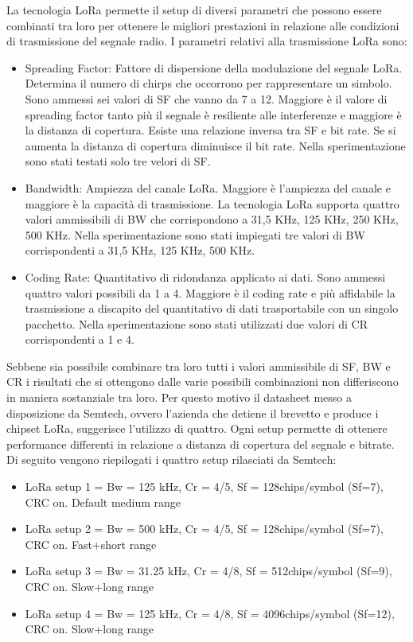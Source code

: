 \documentclass[12pt,a4paper,openright,twoside]{report}
\begin{document}
La tecnologia LoRa permette il setup di diversi parametri che possono essere combinati tra loro per ottenere le migliori prestazioni in relazione alle condizioni di trasmissione del segnale radio. I parametri relativi alla trasmissione LoRa sono:
\begin{itemize}                       
\item Spreading Factor: Fattore di dispersione della modulazione del segnale LoRa. Determina il numero di chirps che occorrono per rappresentare un simbolo. Sono ammessi sei valori di SF che vanno da 7 a 12. Maggiore \`e il valore di spreading factor tanto pi\`u il segnale \`e resiliente alle interferenze e maggiore \`e la distanza di copertura. Esiste una relazione inversa tra SF e bit rate. Se si aumenta la distanza di copertura diminuisce il bit rate. Nella sperimentazione sono stati testati solo tre velori di SF.
\item Bandwidth: Ampiezza del canale LoRa. Maggiore \`e l'ampiezza del canale e maggiore \`e la capacit\`a di trasmissione. La tecnologia LoRa supporta quattro valori ammissibili di BW che corrispondono a 31,5 KHz, 125 KHz, 250 KHz, 500 KHz. Nella sperimentazione sono stati impiegati tre valori di BW corrispondenti a 31,5 KHz, 125 KHz, 500 KHz.
\item Coding Rate: Quantitativo di ridondanza applicato ai dati. Sono ammessi quattro valori possibili da 1 a 4. Maggiore \`e il coding rate e pi\`u affidabile la trasmissione a discapito del quantitativo di dati trasportabile con un singolo pacchetto. Nella sperimentazione sono stati utilizzati due valori di CR corrispondenti a 1 e 4. 
\end{itemize}
Sebbene sia possibile combinare tra loro tutti i valori ammissibile di SF, BW e CR i risultati che si ottengono dalle varie possibili combinazioni non differiscono in maniera sostanziale tra loro.
Per questo motivo il datasheet messo a disposizione da Semtech, ovvero l'azienda che detiene il brevetto e produce i chipset LoRa, suggerisce l'utilizzo di quattro. Ogni setup permette di ottenere performance differenti in relazione a distanza di copertura del segnale e bitrate.
Di seguito vengono riepilogati i quattro setup rilasciati da Semtech:
\begin{itemize}                       
\item LoRa setup 1 =  Bw = 125 kHz, Cr = 4/5, Sf = 128chips/symbol (Sf=7), CRC on. Default medium range
\item LoRa setup 2 =  Bw = 500 kHz, Cr = 4/5, Sf = 128chips/symbol (Sf=7), CRC on. Fast+short range
\item LoRa setup 3 =  Bw = 31.25 kHz, Cr = 4/8, Sf = 512chips/symbol (Sf=9), CRC on. Slow+long range
\item LoRa setup 4 = Bw = 125 kHz, Cr = 4/8, Sf = 4096chips/symbol (Sf=12), CRC on. Slow+long range
\end{itemize}
\end{document}
